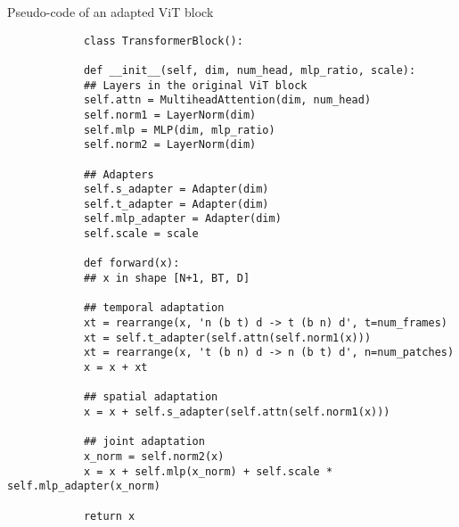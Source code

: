 \documentclass{article} \usepackage{iclr2023_conference,times}
\begin{document}
	\begin{algorithm}[h!]
		\caption{Pseudo-code of an adapted ViT block}
		\label{alg:aim}
		\begin{verbatim}
			class TransformerBlock():
			
			def __init__(self, dim, num_head, mlp_ratio, scale):
			## Layers in the original ViT block
			self.attn = MultiheadAttention(dim, num_head)
			self.norm1 = LayerNorm(dim)
			self.mlp = MLP(dim, mlp_ratio)
			self.norm2 = LayerNorm(dim)
			
			## Adapters
			self.s_adapter = Adapter(dim)
			self.t_adapter = Adapter(dim)
			self.mlp_adapter = Adapter(dim)
			self.scale = scale
			
			def forward(x):
			## x in shape [N+1, BT, D]
			
			## temporal adaptation
			xt = rearrange(x, 'n (b t) d -> t (b n) d', t=num_frames)
			xt = self.t_adapter(self.attn(self.norm1(x)))
			xt = rearrange(x, 't (b n) d -> n (b t) d', n=num_patches)
			x = x + xt
			
			## spatial adaptation
			x = x + self.s_adapter(self.attn(self.norm1(x)))
			
			## joint adaptation
			x_norm = self.norm2(x)
			x = x + self.mlp(x_norm) + self.scale * self.mlp_adapter(x_norm)
			
			return x
			
		\end{verbatim}
	\end{algorithm}
	
	
\end{document}
